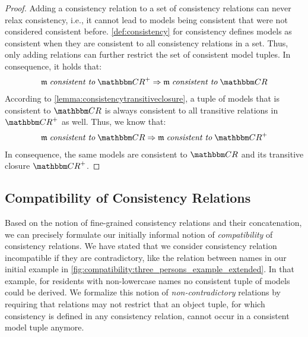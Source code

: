 \begin{proof}
    Adding a consistency relation to a set of consistency relations can never relax consistency, i.e., it cannot lead to models being consistent that were not considered consistent before. \autoref{def:consistency} for consistency defines models as consistent when they are consistent to all consistency relations in a set.
    Thus, only adding relations can further restrict the set of consistent model tuples.
    In consequence, it holds that:
    \begin{align*}
        \modeltuple{m} \consistenttomath \transitiveclosure{\consistencyrelationset{CR}} \Rightarrow \modeltuple{m} \consistenttomath \consistencyrelationset{CR}
    \end{align*}
    According to \autoref{lemma:consistencytransitiveclosure}, a tuple of models that is consistent to $\consistencyrelationset{CR}$ is always consistent to all transitive relations in $\transitiveclosure{\consistencyrelationset{CR}}$ as well. Thus, we know that:
    \begin{align*}
        \modeltuple{m} \consistenttomath \consistencyrelationset{CR} \Rightarrow
        \modeltuple{m} \consistenttomath \transitiveclosure{\consistencyrelationset{CR}}
    \end{align*}
    In consequence, the same models are consistent to  $\consistencyrelationset{CR}$ and its transitive closure $\transitiveclosure{\consistencyrelationset{CR}}$.
\end{proof}


\subsection{Compatibility of Consistency Relations}

Based on the notion of fine-grained consistency relations and their concatenation, we can precisely formulate our initially informal notion of \emph{compatibility} of consistency relations.
We have stated that we consider consistency relation incompatible if they are contradictory, like the relation between names in our initial example in \autoref{fig:compatibility:three_persons_example_extended}.
In that example, for residents with non-lowercase names no consistent tuple of models could be derived.
We formalize this notion of \emph{non-contradictory} relations by requiring that relations may not restrict that an object tuple, for which consistency is defined in any consistency relation, cannot occur in a consistent model tuple anymore.

